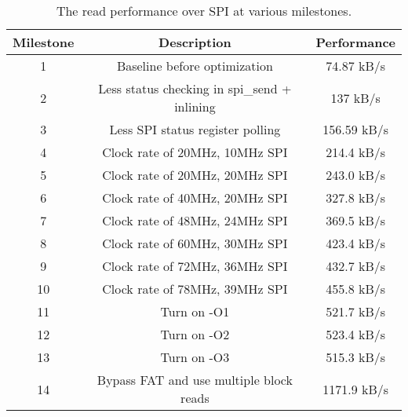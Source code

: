 \begin{table}[h!]
\centering
\begin{tabular}{c|c|c}
	\textbf{Milestone} & \textbf{Description} & \textbf{Performance} \\
	\hline
	1 & Baseline before optimization & 74.87 kB/s \\
	\hline
	2 & Less status checking in spi\_send + inlining & 137 kB/s \\
	\hline
	3 & Less SPI status register polling & 156.59 kB/s \\
	\hline
	4 & Clock rate of 20MHz, 10MHz SPI & 214.4 kB/s \\
	\hline
	5 & Clock rate of 20MHz, 20MHz SPI & 243.0 kB/s \\
	\hline
	6 & Clock rate of 40MHz, 20MHz SPI & 327.8 kB/s \\
	\hline
	7 & Clock rate of 48MHz, 24MHz SPI & 369.5 kB/s \\
	\hline
	8 & Clock rate of 60MHz, 30MHz SPI & 423.4 kB/s \\
	\hline
	9 & Clock rate of 72MHz, 36MHz SPI & 432.7 kB/s \\
	\hline
	10 & Clock rate of 78MHz, 39MHz SPI & 455.8 kB/s \\
	\hline
	11 & Turn on -O1 & 521.7 kB/s \\
	\hline
	12 & Turn on -O2 & 523.4 kB/s \\
	\hline
	13 & Turn on -O3 & 515.3 kB/s \\
	\hline
	14 & Bypass FAT and use multiple block reads & 1171.9 kB/s \\
\end{tabular}
\caption[SPI Read Performance]{The read performance over SPI at various
milestones.}
\label{tab:spi-optimizations-table}
\end{table}
